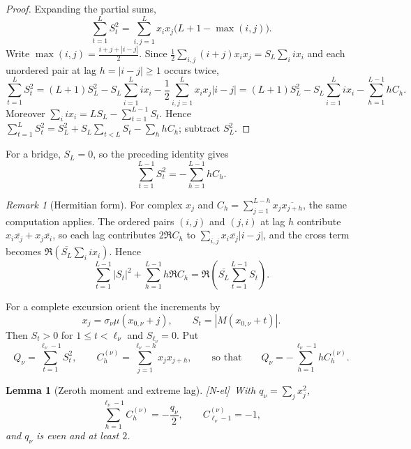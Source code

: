 \documentclass[11pt]{amsart}
\numberwithin{equation}{section}
\theoremstyle{plain}
\newtheorem{lemma}[theorem]{Lemma}
\theoremstyle{definition}
\theoremstyle{remark}
\newtheorem{remark}[theorem]{Remark}
\newcommand{\tagNE}{\textup{[N-el]}}
\begin{document}
\begin{proof}
Expanding the partial sums,
\[
\sum_{t=1}^{L}S_t^2
=\sum_{i,j=1}^{L}x_ix_j\bigl(L+1-\max(i,j)\bigr).
\]
Write $\max(i,j)=\frac{i+j+|i-j|}{2}$. Since
$\frac12\sum_{i,j}(i+j)x_ix_j=S_L\sum_i ix_i$ and each unordered pair at
lag $h=|i-j|\ge1$ occurs twice,
\[
\sum_{t=1}^{L}S_t^2=(L+1)S_L^2-S_L\sum_{i=1}^{L}ix_i
-\frac12\sum_{i,j=1}^{L}x_ix_j|i-j|
=(L+1)S_L^2-S_L\sum_{i=1}^{L}ix_i-\sum_{h=1}^{L-1}hC_h .
\]
Moreover $\sum_i ix_i=LS_L-\sum_{t=1}^{L-1}S_t$.
Hence
$\sum_{t=1}^{L}S_t^2=S_L^2+S_L\sum_{t<L}S_t-\sum_hhC_h$; subtract $S_L^2$.
\end{proof}

For a bridge, $S_L=0$, so the preceding identity gives
\begin{equation}
\label{eq:bridge-triangular}
\sum_{t=1}^{L-1}S_t^2=-\sum_{h=1}^{L-1}hC_h.
\end{equation}

\begin{remark}[Hermitian form]
\label{rem:hermitian}
For complex $x_j$ and $C_h=\sum_{j=1}^{L-h}x_j\overline{x_{j+h}}$, the same
computation applies. The ordered pairs $(i,j)$ and $(j,i)$ at lag $h$
contribute $x_i\overline{x_j}+x_j\overline{x_i}$, so each lag contributes
$2\Re C_h$ to $\sum_{i,j}x_i\overline{x_j}|i-j|$, and the cross term
becomes $\Re(\overline{S_L}\sum_i ix_i)$. Hence
\[
\sum_{t=1}^{L-1}|S_t|^2+\sum_{h=1}^{L-1}h\Re C_h
=\Re\!\left(\overline{S_L}\sum_{t=1}^{L-1}S_t\right).
\]
\end{remark}

For a complete excursion orient the increments by
\begin{equation}
\label{eq:orientation}
x_j=\sigma_\nu\mu(x_{0,\nu}+j),\qquad
S_t=|M(x_{0,\nu}+t)|.
\end{equation}
Then $S_t>0$ for $1\le t<\ell_\nu$ and $S_{\ell_\nu}=0$. Put
\begin{equation}
\label{eq:Q_def}
Q_\nu=\sum_{t=1}^{\ell_\nu-1}S_t^2,\qquad
C_h^{(\nu)}=\sum_{j=1}^{\ell_\nu-h}x_jx_{j+h},
\qquad\text{so that}\qquad
Q_\nu=-\sum_{h=1}^{\ell_\nu-1}hC_h^{(\nu)}.
\end{equation}

\begin{lemma}[Zeroth moment and extreme lag]
\label{lem:zeroth-corr}
\tagNE\ With $q_\nu=\sum_jx_j^2$,
\begin{equation}
\label{eq:zeroth-corr}
\sum_{h=1}^{\ell_\nu-1}C_h^{(\nu)}=-\frac{q_\nu}{2},\qquad
C_{\ell_\nu-1}^{(\nu)}=-1,
\end{equation}
and $q_\nu$ is even and at least $2$.
\end{lemma}
\end{document}
